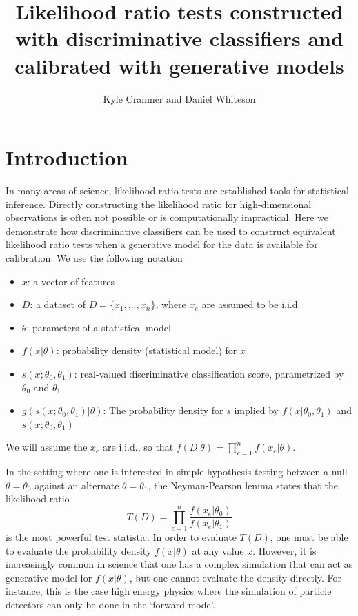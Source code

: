 \documentclass[11pt, oneside]{article}   	%
\title{Likelihood ratio tests constructed with discriminative classifiers and calibrated with generative models}
\author{Kyle Cranmer and Daniel Whiteson}
\begin{document}
\maketitle

\section{Introduction}


In many areas of science, likelihood ratio tests  are established tools for statistical inference. 
Directly constructing the likelihood ratio for high-dimensional observations 
is often not possible or is computationally impractical. Here we demonstrate how 
discriminative classifiers can be used to construct equivalent likelihood ratio tests when 
a generative model for the data is available for calibration.  We use the following notation

\begin{itemize}
 \item $x$: a vector of features
 \item $D$: a dataset of $D=\{x_1, \dots, x_n\}$, where $x_e$ are assumed to be i.i.d.
 \item $\theta$: parameters of a statistical model
\item $f(x| \theta)$:  probability density  (statistical model) for $x$ 
\item $s(x;\theta_0, \theta_1)$: real-valued discriminative classification score, parametrized by $\theta_0$ and $\theta_1$
\item $g( s(x; \theta_0, \theta_1) | \theta )$: The probability density  for $s$ implied by $f(x|\theta_0, \theta_1)$ and $s(x;\theta_0, \theta_1)$
\end{itemize}
We will assume the $x_e$ are i.i.d., so that $f(D|\theta) = \prod_{e=1}^n f(x_e | \theta)$.

In the setting where one is interested in simple hypothesis testing between a null $\theta=\theta_0$ against an alternate $\theta=\theta_1$, the Neyman-Pearson lemma states that the likelihood ratio 
\begin{equation}
T(D) = \prod_{e=1}^n \frac{ f(x_e|\theta_0)}{ f(x_e|\theta_1)}
\end{equation}
is the most powerful test statistic. In order to evaluate $T(D)$, one must be able to evaluate the probability density 
$f(x| \theta)$ at any value $x$. However, it is increasingly common in science that one has a complex simulation that 
can act as generative model  for $f(x|\theta)$, but one cannot evaluate the density directly. For instance, this is the case 
high energy physics where the simulation of particle detectors can only be done in the `forward mode'. 
\end{document}
